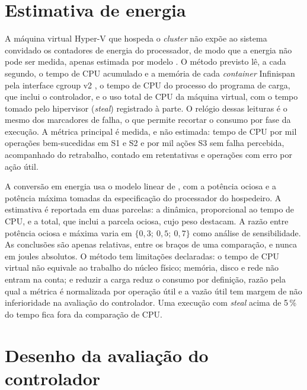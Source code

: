 
\section*{Estimativa de energia}
\label{sec-energia}

A máquina virtual Hyper-V que hospeda o \emph{cluster} não expõe ao sistema convidado os contadores de energia do processador, de modo que a energia não pode ser medida, apenas estimada por modelo \citep{kansal_vm_power_2010}. O método previsto lê, a cada segundo, o tempo de CPU acumulado e a memória de cada \emph{container} Infinispan pela interface cgroup v2 \citep{linux_cgroup_v2}, o tempo de CPU do processo do programa de carga, que inclui o controlador, e o uso total de CPU da máquina virtual, com o tempo tomado pelo hipervisor (\emph{steal}) registrado à parte. O relógio dessas leituras é o mesmo dos marcadores de falha, o que permite recortar o consumo por fase da execução. A métrica principal é medida, e não estimada: tempo de CPU por mil operações bem-sucedidas em S1 e S2 e por mil ações S3 sem falha percebida, acompanhado do retrabalho, contado em retentativas e operações com erro por ação útil.

A conversão em energia usa o modelo linear de \citet{fan_power_provisioning_2007}, com a potência ociosa e a potência máxima tomadas da especificação do processador do hospedeiro. A estimativa é reportada em duas parcelas: a dinâmica, proporcional ao tempo de CPU, e a total, que inclui a parcela ociosa, cujo peso \citet{barroso_holzle_energy_proportional_2007} destacam. A razão entre potência ociosa e máxima varia em $\{0{,}3;\ 0{,}5;\ 0{,}7\}$ como análise de sensibilidade. As conclusões são apenas relativas, entre os braços de uma comparação, e nunca em joules absolutos. O método tem limitações declaradas: o tempo de CPU virtual não equivale ao trabalho do núcleo físico; memória, disco e rede não entram na conta; e reduzir a carga reduz o consumo por definição, razão pela qual a métrica é normalizada por operação útil e a vazão útil tem margem de não inferioridade na avaliação do controlador. Uma execução com \emph{steal} acima de 5\,\% do tempo fica fora da comparação de CPU.

\section*{Desenho da avaliação do controlador}
\label{sec-avaliacao-controlador}

